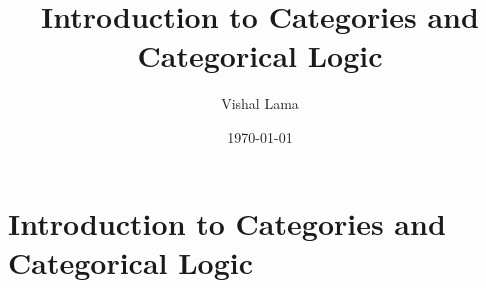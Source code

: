 \documentclass[]{amsbook}
\title{Introduction to Categories and Categorical Logic}
\author{Vishal Lama}
\date{\today}
\begin{document}
\frontmatter
\maketitle
\tableofcontents
\mainmatter

\chapter{Introduction to Categories and Categorical Logic}
\end{document}
